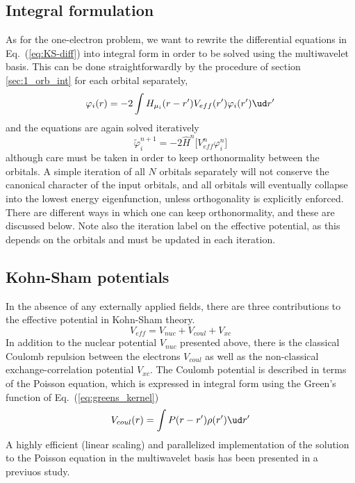 \subsection{Integral formulation}
As for the one-electron problem, we want to rewrite the differential 
equations in Eq.~(\ref{eq:KS-diff}) into integral form in order to be 
solved using the multiwavelet basis. This can be done straightforwardly
by the procedure of section \ref{sec:1_orb_int} for each orbital separately, 
\begin{equation}
    \label{eq:KS-int}
    \varphi_i(r) = -2\int H_{\mu_i}(r-r')V_{eff}(r') \varphi_i(r') \ud r'
\end{equation}
and the equations are again solved iteratively
\begin{equation}
    \label{eq:KS-iter}
    \tilde{\varphi}^{n+1}_i = -2 \hat{H}^n\big[V^n_{eff}\varphi^n_i\big]
\end{equation}
although care must be taken in order to keep orthonormality between the 
orbitals. A simple iteration of all $N$ orbitals separately will not 
conserve the canonical character of the input orbitals, and all orbitals 
will eventually collapse into the lowest energy eigenfunction, unless 
orthogonality is explicitly enforced. There are different ways in which 
one can keep orthonormality, and these are discussed below. Note also the
iteration label on the effective potential, as this depends on the orbitals 
and must be updated in each iteration.

\subsection{Kohn-Sham potentials}
In the absence of any externally applied fields, there are three contributions 
to the effective potential in Kohn-Sham theory.
\begin{equation}
    \label{eq:eff_pot}
    V_{eff} = V_{nuc} + V_{coul} + V_{xc}
\end{equation}
In addition to the nuclear potential $V_{nuc}$ presented above, there is the 
classical Coulomb repulsion between the electrons $V_{coul}$ as well as the 
non-classical exchange-correlation potential $V_{xc}$. The Coulomb potential 
is described in terms of the Poisson equation, which is expressed in integral 
form using the Green's function of Eq.~(\ref{eq:greens_kernel})
\begin{equation}
    \label{eq:coulomb}
    V_{coul}(r) = \int P(r-r')\rho(r')\ud r'
\end{equation}
A highly efficient (linear scaling) and parallelized implementation of the 
solution to the Poisson equation in the multiwavelet basis has been presented 
in a previuos study\cite{mwpar}. 


